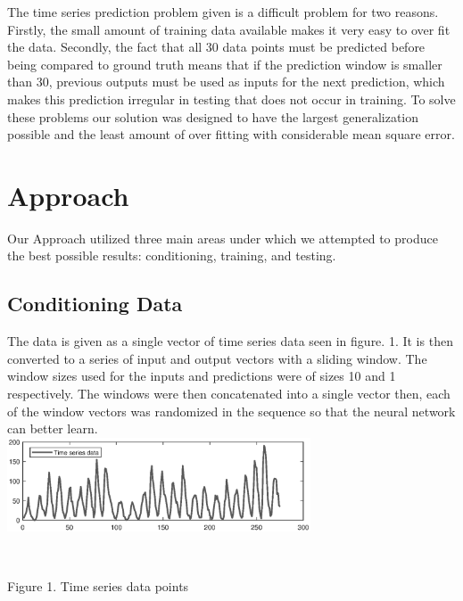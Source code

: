 \documentclass[conference]{IEEEtran}
\begin{document}
The time series prediction problem given is a difficult problem for two reasons. Firstly, the small amount of training data available makes it very easy to over fit the data. Secondly, the fact that all 30 data points must be predicted before being compared to ground truth means that if the prediction window is smaller than 30, previous outputs must be used as inputs for the next prediction, which makes this prediction irregular in testing that does not occur in training. To solve these problems our solution was designed to have the largest generalization possible and the least amount of over fitting with considerable mean square error.

\section{Approach}
Our Approach utilized three main areas under which we attempted to produce the best possible results: conditioning, training, and testing.

\subsection{Conditioning Data}
The data is given as a single vector of time series data seen in figure. 1. It is then converted to a series of input and output vectors with a sliding window. The window sizes used for the inputs and predictions were of sizes 10 and 1 respectively. The windows were then concatenated into a single vector then, each of the window vectors was randomized in the sequence so that the neural network can better learn. \\

\includegraphics[scale=0.75, width=9cm]{figure3.eps}

\\
\begin{center}Figure 1. Time series data points\end{center}
\end{document}
